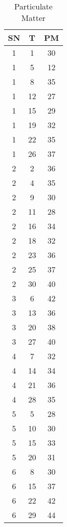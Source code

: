 \documentclass{exam}
\begin{document}
\begin{table}
    \centering
    \caption{Particulate Matter}
    \begin{tabular}{|ccc|}
        \hline
        SN & T  & PM \\\hline
        1  & 1  & 30 \\
        1  & 5  & 12 \\
        1  & 8  & 35 \\
        1  & 12 & 27 \\
        1  & 15 & 29 \\
        1  & 19 & 32 \\
        1  & 22 & 35 \\
        1  & 26 & 37 \\
        2  & 2  & 36 \\
        2  & 4  & 35 \\
        2  & 9  & 30 \\
        2  & 11 & 28 \\
        2  & 16 & 34 \\
        2  & 18 & 32 \\
        2  & 23 & 36 \\
        2  & 25 & 37 \\
        2  & 30 & 40 \\
        3  & 6  & 42 \\
        3  & 13 & 36 \\
        3  & 20 & 38 \\
        3  & 27 & 40 \\
        4  & 7  & 32 \\
        4  & 14 & 34 \\
        4  & 21 & 36 \\
        4  & 28 & 35 \\
        5  & 5  & 28 \\
        5  & 10 & 30 \\
        5  & 15 & 33 \\
        5  & 20 & 31 \\
        6  & 8  & 30 \\
        6  & 15 & 37 \\
        6  & 22 & 42 \\
        6  & 29 & 44 \\\hline
    \end{tabular}
\end{table}
\end{document}
